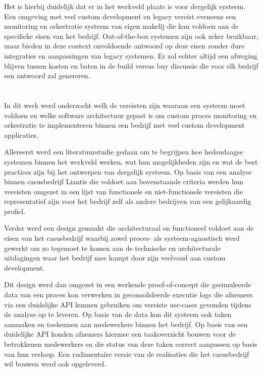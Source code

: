 Het is hierbij duidelijk dat er in het werkveld plaats is voor dergelijk systeem. Een omgeving met veel custom development en legacy vereist eveneens een monitoring en orkestratie systeem van eigen makelij die kan voldoen aan de specifieke eisen van het bedrijf. Out-of-the-box systemen zijn ook zeker bruikbaar, maar bieden in deze context onvoldoende antwoord op deze eisen zonder dure integraties en aanpassingen van legacy systemen. Er zal echter altijd een afweging blijven tussen kosten en baten in de build versus buy discussie die voor elk bedrijf een antwoord zal genereren.

\section{}%
\label{sec:algemene conclusie}
In dit werk werd onderzocht welk de vereisten zijn waaraan een systeem moet voldoen en welke software architectuur gepast is om custom proces monitoring en orkestratie te implementeren binnen een bedrijf met veel custom development applicaties. \newline

Allereerst werd een literatuurstudie gedaan om te begrijpen hoe hedendaagse systemen binnen het werkveld werken, wat hun mogelijkheden zijn en wat de best practices zijn bij het ontwerpen van dergelijk systeem. Op basis van een analyse binnen casusbedrijf Liantis die voldoet aan bovenstaande criteria werden hun vereisten omgezet in een lijst van functionele en niet-functionele vereisten die representatief zijn voor het bedrijf zelf als andere bedrijven van een gelijkaardig profiel.\newline

Verder werd een design gemaakt die architecturaal en functioneel voldoet aan de eisen van het casusbedrijf waarbij zowel proces- als systeem-agnostisch werd gewerkt om zo tegemoet te komen aan de technische en architecturale uitdagingen waar het bedrijf mee kampt door zijn veelvoud aan custom development.\newline

Dit design werd dan omgezet in een werkende proof-of-concept die gesimuleerde data van een proces kon verwerken in geconsolideerde executie logs die afnemers via een duidelijke API kunnen gebruiken om vereiste use-cases gevonden tijdens de analyse op te leveren.  Op basis van de data kon dit systeem ook taken aanmaken en toekennen aan medewerkers binnen het bedrijf. Op basis van een duidelijke API konden afnemers hiermee een taakoverzicht bouwen voor de betrokkenen medewerkers en die status van deze taken correct aanpassen op basis van hun verloop. Een rudimentaire versie van de realisaties die het casusbedrijf wil bouwen werd ook opgeleverd.\newline

